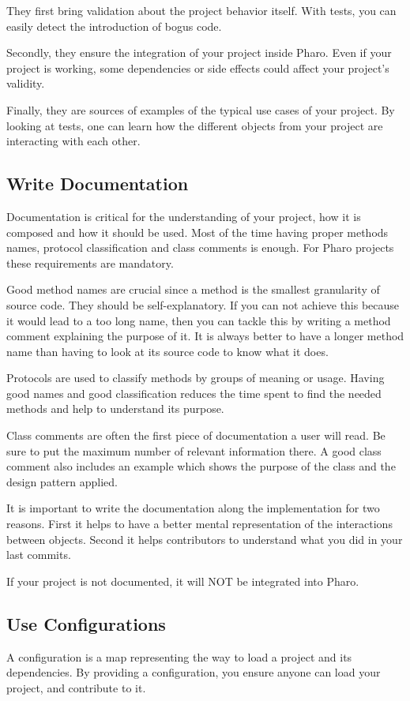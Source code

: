 \documentclass[10pt]{article}
\begin{document}
They first bring validation about the project behavior itself. With tests, you can easily detect the introduction of bogus code.

Secondly, they ensure the integration of your project inside Pharo. Even if your project is working, some dependencies or side effects could affect your project's validity.

Finally, they are sources of examples of the typical use cases of your project. By looking at tests, one can learn how the different objects from your project are interacting with each other.

\subsection{Write Documentation}
Documentation is critical for the understanding of your project, how it is composed and how it should be used. Most of the time having proper methods names, protocol classification and class comments is enough. For Pharo projects these requirements are mandatory.

Good method names are crucial since a method is the smallest granularity of source code.
They should be self-explanatory. If you can not achieve this because it would lead to a too long name, then you can tackle this by writing a method comment explaining the purpose of it. It is always better to have a longer method name than having to look at its source code to know what it does.

Protocols are used to classify methods by groups of meaning or usage. Having good names and good classification reduces the time spent to find the needed methods and help to understand its purpose. 

Class comments are often the first piece of documentation a user will read. Be sure to put the maximum number of relevant information there. A good class comment also includes an example which shows the purpose of the class and the design pattern applied.

It is important to write the documentation along the implementation for two reasons. First it helps to have a better mental representation of the interactions between objects. Second it helps contributors to understand what you did in your last commits.

If your project is not documented, it will NOT be integrated into Pharo.

\subsection{Use Configurations}\label{subsec:configurations}
A configuration is a map representing the way to load a project and its dependencies. 
By providing a configuration, you ensure anyone can load your project, and contribute to it.
\end{document}
